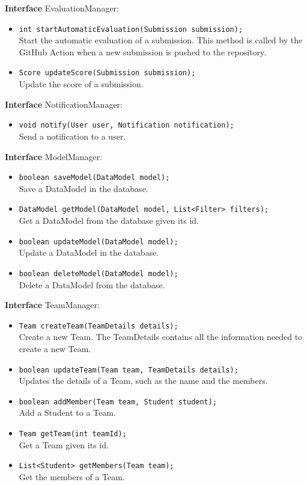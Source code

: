 \textbf{Interface} EvaluationManager:
\begin{itemize}
    \item \texttt{int startAutomaticEvaluation(Submission submission);}
    \\ Start the automatic evaluation of a submission. This method is called by the GitHub Action when a new submission is pushed to the repository.
    \item \texttt{Score updateScore(Submission submission);}
    \\ Update the score of a submission.
\end{itemize}

\textbf{Interface} NotificationManager:
\begin{itemize}
    \item \texttt{void notify(User user, Notification notification);}
    \\ Send a notification to a user.
\end{itemize}

\textbf{Interface} ModelManager:
\begin{itemize}
    \item \texttt{boolean saveModel(DataModel model);}
    \\ Save a DataModel in the database.
    \item \texttt{DataModel getModel(DataModel model, List<Filter> filters);}
    \\ Get a DataModel from the database given its id.
    \item \texttt{boolean updateModel(DataModel model);}
    \\ Update a DataModel in the database.
    \item \texttt{boolean deleteModel(DataModel model);}
    \\ Delete a DataModel from the database.
\end{itemize}

\textbf{Interface} TeamManager:
\begin{itemize}
    \item \texttt{Team createTeam(TeamDetails details);}
    \\ Create a new Team. The TeamDetails contains all the information needed to create a new Team.
    \item \texttt{boolean updateTeam(Team team, TeamDetails details);}
    \\ Updates the details of a Team, such as the name and the members.
    \item \texttt{boolean addMember(Team team, Student student);}
    \\ Add a Student to a Team.
    \item \texttt{Team getTeam(int teamId);}
    \\ Get a Team given its id.
    \item \texttt{List<Student> getMembers(Team team);}
    \\ Get the members of a Team.
\end{itemize}
